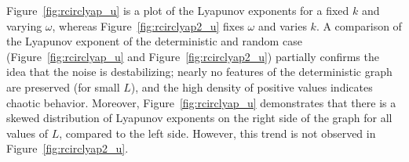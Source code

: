 Figure~\ref{fig:rcirclyap_u} is a plot of the Lyapunov
exponents for a fixed $k$ and varying $\omega$, whereas
Figure~\ref{fig:rcirclyap2_u} fixes $\omega$ and varies $k$. A comparison of the Lyapunov exponent of the deterministic and random
case (Figure~\ref{fig:rcirclyap_u} and Figure~\ref{fig:rcirclyap2_u})
partially confirms the idea that the noise is destabilizing; nearly no
features of the deterministic graph are preserved (for small $L$), and the high
density of positive values indicates chaotic
behavior. Moreover, Figure~\ref{fig:rcirclyap_u} demonstrates that there is a skewed
distribution of Lyapunov exponents on the right side of the graph for
all values of $L$, compared to the left side. However, this trend is
not observed in Figure~\ref{fig:rcirclyap2_u}.


